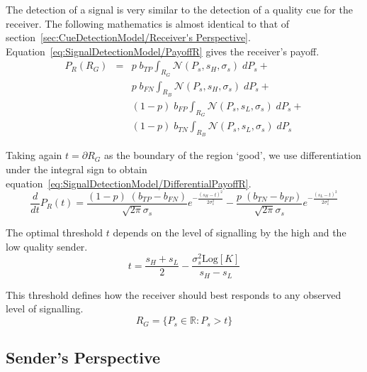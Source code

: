 \documentclass[a4paper,12pt]{article}
\numberwithin{equation}{section}
\begin{document}
The detection of a signal is very similar to the detection of a quality cue for the receiver. The following mathematics is almost identical to that of section~\ref{sec:CueDetectionModel/Receiver's Perspective}. Equation~\ref{eq:SignalDetectionModel/PayoffR} gives the receiver's payoff.
\begin{equation}
\label{eq:SignalDetectionModel/PayoffR}
\begin{array}{rcl}
P_{R}(R_{G}) &=& p \; b_{TP} \displaystyle \int_{R_{G}} \mathcal{N}(P_{s}, s_{H}, \sigma_{s}) \; dP_{s} +\\
&&p \; b_{FN} \displaystyle \int_{R_{B}} \mathcal{N}(P_{s}, s_{H}, \sigma_{s}) \; dP_{s} +\\
&&(1-p) \; b_{FP} \displaystyle \int_{R_{G}} \mathcal{N}(P_{s}, s_{L}, \sigma_{s}) \; dP_{s} +\\
&&(1-p) \; b_{TN} \displaystyle \int_{R_{B}} \mathcal{N}(P_{s}, s_{L}, \sigma_{s}) \; dP_{s}
\end{array}
\end{equation}

Taking again $t=\partial R_{G}$ as the boundary of the region `good', we use differentiation under the integral sign to obtain equation~\ref{eq:SignalDetectionModel/DifferentialPayoffR}.
\begin{equation}
\label{eq:SignalDetectionModel/DifferentialPayoffR}
\frac{d}{dt}P_{R}(t)= \frac{(1-p) \; (b_{TP}-b_{FN})}{\sqrt{2 \pi} \sigma_{s}} e^{-\frac{(s_{H}-t)^2}{2 \sigma_{s}^2}} - \frac{p \; (b_{TN}-b_{FP})}{\sqrt{2 \pi} \sigma_{s}} e^{-\frac{(s_{L}-t)^2}{2 \sigma_{s}^2}}
\end{equation}

The optimal threshold $t$ depends on the level of signalling by the high and the low quality sender.
\begin{equation}
\label{eq:SignalDetectionModel/Threshold}
t=\frac{s_{H}+s_{L}}{2}-\frac{\sigma_{s}^2 \text{Log}[K]}{s_{H}-s_{L}}
\end{equation}

This threshold defines how the receiver should best responds to any observed level of signalling.
\begin{equation}
\label{eq:SignalDetectionModel/RG}
R_{G} = \{P_{s} \in \mathbb{R} : P_{s}>t\}
\end{equation}


\subsection{Sender's Perspective}
\label{sec:SignalDetectionModel/Sender's Perspective}
\end{document}
